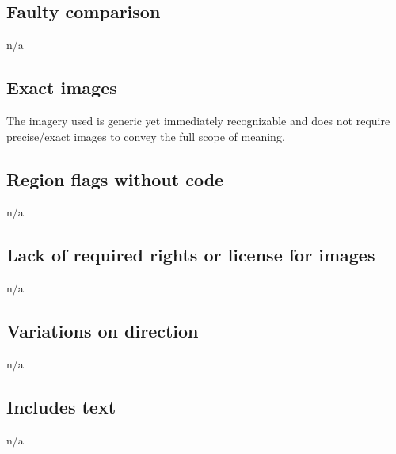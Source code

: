 \documentclass[oneside]{article}
\begin{document}
\subsection{Faulty comparison}
n/a

\subsection{Exact images}
The imagery used is generic yet immediately recognizable and does not require
precise/exact images to convey the full scope of meaning.

\subsection{Region flags without code}
n/a

\subsection{Lack of required rights or license for images}
n/a

\subsection{Variations on direction}
n/a

\subsection{Includes text}
n/a
\end{document}
